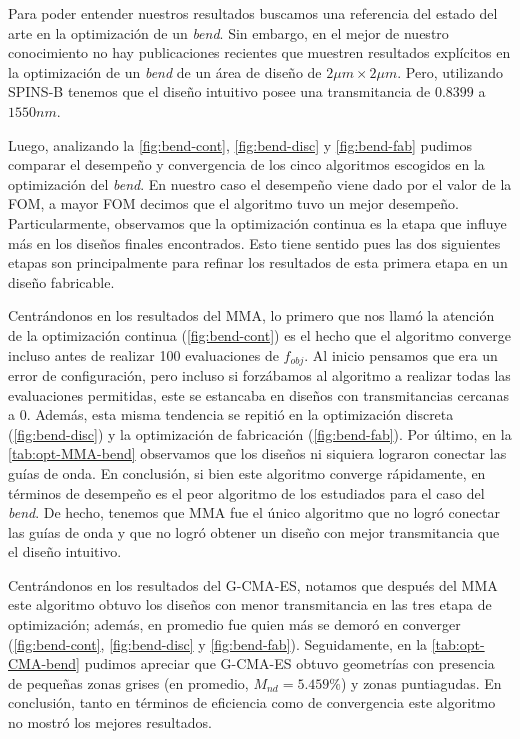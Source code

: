 Para poder entender nuestros resultados buscamos una referencia del estado del arte
en la optimización de un \emph{bend}.
Sin embargo, en el mejor de nuestro conocimiento no hay publicaciones recientes que muestren
resultados explícitos en la optimización de un \emph{bend} de un área de diseño de $2 \mu m \times 2 \mu m$.
Pero, utilizando SPINS-B tenemos que el diseño intuitivo posee una transmitancia de $0.8399$ a $1550 nm$.

Luego, analizando la \autoref{fig:bend-cont}, \autoref{fig:bend-disc} y \autoref{fig:bend-fab}
pudimos comparar el desempeño y convergencia de los cinco algoritmos escogidos 
en la optimización del \emph{bend}.
En nuestro caso el desempeño viene dado por el valor de la FOM, a mayor FOM 
decimos que el algoritmo tuvo un mejor desempeño.
Particularmente, observamos que la optimización continua es la etapa que influye más
en los diseños finales encontrados. Esto tiene sentido pues las dos siguientes etapas
son principalmente para refinar los resultados de esta primera etapa en un diseño
fabricable.

Centrándonos en los resultados del MMA, lo primero que nos llamó
la atención de la optimización continua (\autoref{fig:bend-cont}) es el hecho que el algoritmo converge 
incluso antes de realizar 100 evaluaciones de $f_{obj}$. 
Al inicio pensamos que era un error de configuración,
pero incluso si forzábamos al algoritmo a realizar todas las evaluaciones permitidas, 
este se estancaba en diseños con transmitancias cercanas a 0.
Además, esta misma tendencia se repitió en la optimización discreta (\autoref{fig:bend-disc})
y la optimización de fabricación (\autoref{fig:bend-fab}).
Por último, en la \autoref{tab:opt-MMA-bend} observamos que los diseños 
ni siquiera lograron conectar las guías de onda.
En conclusión, si bien este algoritmo converge rápidamente, en términos de desempeño
es el peor algoritmo de los estudiados para el caso del \emph{bend}.
De hecho, tenemos que MMA fue el único algoritmo que no logró conectar las guías de onda y
que no logró obtener un diseño con mejor transmitancia que el diseño intuitivo.

Centrándonos en los resultados del G-CMA-ES, notamos que después del MMA este algoritmo
obtuvo los diseños con menor transmitancia en las tres etapa de optimización;
además, en promedio fue quien más se demoró en converger
(\autoref{fig:bend-cont}, \autoref{fig:bend-disc} y \autoref{fig:bend-fab}).
Seguidamente, en la \autoref{tab:opt-CMA-bend} pudimos apreciar que G-CMA-ES obtuvo geometrías 
con presencia de pequeñas zonas grises (en promedio, $M_{nd} = 5.459 \%$) y zonas puntiagudas.
En conclusión, tanto en términos de eficiencia como de convergencia este algoritmo no
mostró los mejores resultados.

